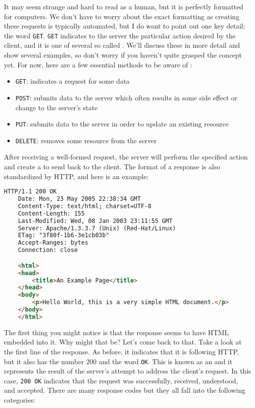 It may seem strange and hard to read as a human, but it is perfectly formatted for computers. We don't have to worry about the exact formatting as creating these requests is typically automated, but I do want to point out one key detail: the word \texttt{GET}. \texttt{GET} indicates to the server the particular action desired by the client, and it is one of several so called . We'll discuss these in more detail and show several examples, so don't worry if you haven't quite grasped the concept yet. For now, here are a few essential methods to be aware of : 

\begin{itemize}
    \item \texttt{GET}: indicates a request for some data
    \item \texttt{POST}: submits data to the server which often results in some side effect or change to the server's state
    \item \texttt{PUT}: submits data to the server in order to update an existing resource
    \item \texttt{DELETE}: removes some resource from the server
\end{itemize}

After receiving a well-formed request, the server will perform the specified action and create a  to send back to the client. The format of a response is also standardized by HTTP, and here is an example:

\begin{lstlisting}[language=html]
    HTTP/1.1 200 OK
    Date: Mon, 23 May 2005 22:38:34 GMT
    Content-Type: text/html; charset=UTF-8
    Content-Length: 155
    Last-Modified: Wed, 08 Jan 2003 23:11:55 GMT
    Server: Apache/1.3.3.7 (Unix) (Red-Hat/Linux)
    ETag: "3f80f-1b6-3e1cb03b"
    Accept-Ranges: bytes
    Connection: close

    <html>
    <head>
        <title>An Example Page</title>
    </head>
    <body>
        <p>Hello World, this is a very simple HTML document.</p>
    </body>
    </html>
\end{lstlisting}


The first thing you might notice is that the response seems to have HTML embedded into it. Why might that be? Let's come back to that. Take a look at the first line of the response. As before, it indicates that it is following HTTP, but it also has the number 200 and the word \texttt{OK}. This is known as an  and it represents the result of the server's attempt to address the client's request. In this case, \texttt{200 OK} indicates that the request was successfully, received, understood, and accepted. There are many response codes but they all fall into the following categories:

